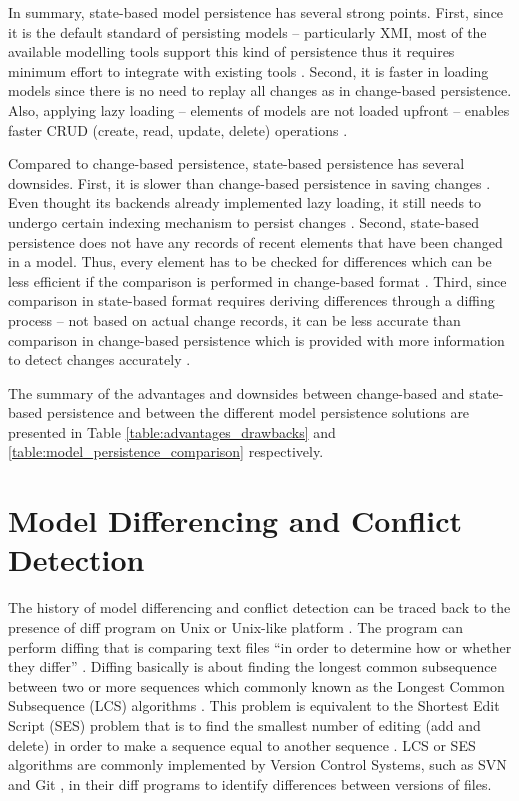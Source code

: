 In summary, state-based model persistence has several strong points. First, since it is the default standard of persisting models -- particularly XMI, most of the available modelling tools support this kind of persistence thus it requires minimum effort to integrate with existing tools \cite{koegel2010emfstore}. Second, it is faster in loading models since there is no need to replay all changes as in change-based persistence. Also, applying lazy loading -- elements of models are not loaded upfront -- enables faster CRUD (create, read, update, delete) operations \cite{DBLP:conf/models/Espinazo-PaganCM11,daniel2016neoemf}. 

Compared to change-based persistence, state-based persistence has several downsides. First, it is slower than change-based persistence in saving changes \cite{mens2002state}. Even thought its backends already implemented lazy loading, it still needs to undergo certain indexing mechanism to persist changes \cite{daniel2016neoemf,DBLP:conf/models/Espinazo-PaganCM11,eclipse2019cdo}. Second, state-based persistence does not have any records of recent elements that have been changed in a model. Thus, every element has to be checked for differences which can be less efficient if the comparison is performed in change-based format \cite{DBLP:conf/edoc/KoegelHLHD10}. Third, since comparison in state-based format requires deriving differences through a diffing process -- not based on actual change records, it can be less accurate than comparison in change-based persistence which is provided with more information to detect changes accurately \cite{mens2002state,DBLP:conf/edoc/KoegelHLHD10}. 

The summary of the advantages and downsides between change-based and state-based persistence and between the different model persistence solutions 
are presented in Table \ref{table:advantages_drawbacks} and \ref{table:model_persistence_comparison} respectively.

\section{Model Differencing and Conflict Detection}
\label{sec:model_differencing_and_conflict_detection}
The history of model differencing and conflict detection can be traced back to the presence of \textsf{diff} program on Unix or Unix-like platform \cite{hunt1976algorithm}. The program can perform diffing that is comparing text files ``in order to determine how or whether they differ'' \cite{diff}. Diffing basically is about finding the longest common subsequence between two or more sequences which commonly known as the Longest Common Subsequence (LCS) algorithms \cite{bergroth2000lcs}. This problem is equivalent to the Shortest Edit Script (SES) problem that is to find the smallest number of editing (add and delete) in order to make a sequence equal to another sequence \cite{DBLP:journals/algorithmica/Meyers86}. LCS or SES algorithms are commonly implemented by Version Control Systems, such as SVN \cite{svn-diff} and Git \cite{git-diff}, in their \textsf{diff} programs to identify differences between versions of files.   

